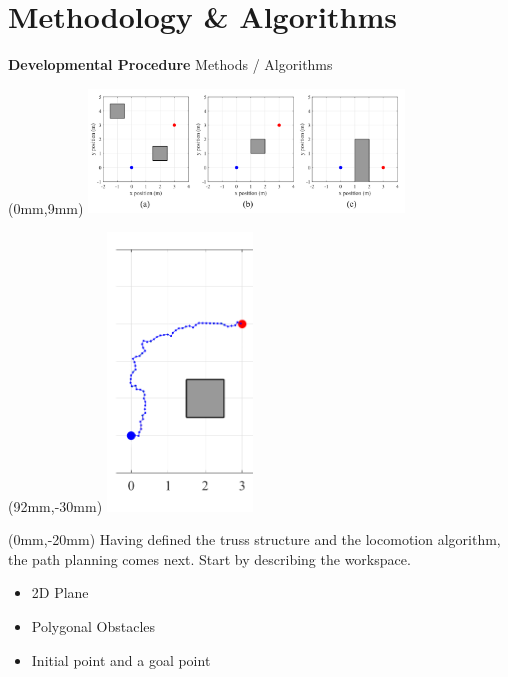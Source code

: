 \documentclass[11pt,aspectratio=169]{beamer}
\begin{document}
\section{Methodology \& Algorithms}

\begin{frame}[fragile]{\textbf{Developmental Procedure} \hfill \fontsize{8}{8}\selectfont Methods / Algorithms}
    
        \begin{textblock*}{5cm}(0mm,9mm) %
        \includegraphics[height=33mm]{elements/[12]-PLAN.png}
        \end{textblock*}

        \begin{textblock*}{5cm}(92mm,-30mm) %
        \includegraphics[height=74mm]{elements/[13]-PLAN.png}
        \end{textblock*}

        \begin{textblock*}{87mm}(0mm,-20mm)
         Having defined the truss structure and the locomotion algorithm, the path planning comes next. Start by describing the workspace.  
        
        \begin{itemize}
            \item 2D Plane
            \item Polygonal Obstacles
            \item Initial point and a goal point
        \end{itemize}


\end{textblock*}
\end{frame}
\end{document}

